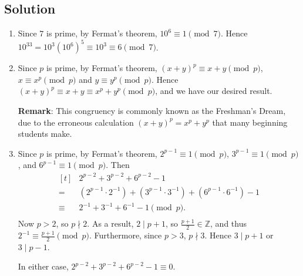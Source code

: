 \documentclass{article}
\begin{document}
\subsection*{Solution}
    \begin{enumerate}
        \item Since $7$ is prime, by Fermat's theorem, $10^{6} \equiv 1 \pmod{7}$. Hence $10^{33} = 10^{3}(10^{6})^{5} \equiv 10^{3} \equiv 6 \pmod{7}$.
        \item Since $p$ is prime, by Fermat's theorem, $(x + y)^{p} \equiv x + y \pmod{p}$, $x \equiv x^{p} \pmod{p}$ and $y \equiv y^{p} \pmod{p}$. Hence $(x + y)^{p} \equiv x + y \equiv x^{p} + y^{p} \pmod{p}$, and we have our desired result.
        
        \vspace{1.5mm}
        \textbf{Remark}: This congruency is commonly known as the Freshman's Dream, due to the erroneous calculation $(x + y)^{p} = x^{p} + y^{p}$ that many beginning students make.
        \item Since $p$ is prime, by Fermat's theorem, $2^{p - 1} \equiv 1 \pmod{p}$, $3^{p - 1} \equiv 1 \pmod{p}$, and $6^{p - 1} \equiv 1 \pmod{p}$. Then
        $$\begin{aligned}[t]
            &2^{p-2} + 3^{p-2} + 6^{p-2} - 1 \\
            ={}& (2^{p - 1} \cdot 2^{-1}) + (3^{p - 1} \cdot 3^{-1}) + (6^{p - 1} \cdot 6^{-1}) - 1 \\
            \equiv{}& 2^{-1} + 3^{-1} + 6^{-1} - 1 \pmod{p}. \\
        \end{aligned}$$
        Now $p > 2$, so $p \nmid 2$. As a result, $2 \mid p + 1$, so $\frac{p + 1}{2} \in \mathbb{Z}$, and thus $2^{-1} \equiv \frac{p + 1}{2} \pmod{p}$. Furthermore, since $p > 3$, $p \nmid 3$. Hence $3 \mid p + 1$ or $3 \mid p - 1$.
        
        In either case, $2^{p-2} + 3^{p-2} + 6^{p-2} - 1 \equiv 0$.
    \end{enumerate}
\end{document}
